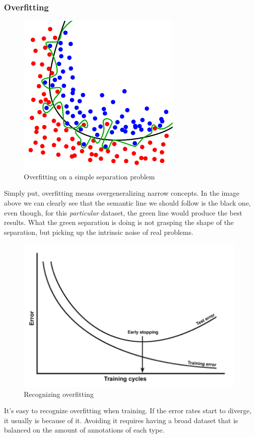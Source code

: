 \subsubsection{Overfitting}\label{s:trainalg-overfitting}
\begin{figure}[H]
	\centering
	\includegraphics[scale=0.4]{images/overfitting.png}
	\caption{Overfitting on a simple separation problem}
	\label{f:overfitting}
\end{figure}
Simply put, overfitting means overgeneralizing narrow concepts. In the image above we can clearly see that the semantic line we should follow is the black one, even though, for this \emph{particular} dataset, the green line would produce the best results.
What the green separation is doing is not grasping the shape of the separation, but picking up the intrinsic noise of real problems.

\begin{figure}[H]
	\centering
	\includegraphics[scale=1.2]{images/overfittinglines.png}
	\caption{Recognizing overfitting}
	\label{f:overfittinglines}
\end{figure}
It's easy to recognize overfitting when training. If the error rates start to diverge, it usually is because of it. Avoiding it requires having a broad dataset that is balanced on the amount of annotations of each type.

